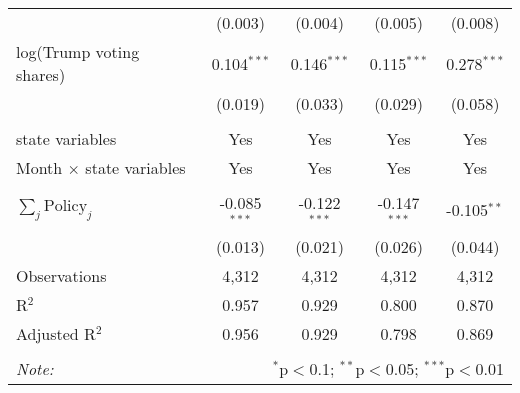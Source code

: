 \begin{tabular}{@{\extracolsep{1pt}}lcccc}
  & (0.003) & (0.004) & (0.005) & (0.008) \\ 
  log(Trump voting shares) & 0.104$^{***}$ & 0.146$^{***}$ & 0.115$^{***}$ & 0.278$^{***}$ \\ 
  & (0.019) & (0.033) & (0.029) & (0.058) \\ 
 \hline \\[-1.8ex] 
state variables & Yes & Yes & Yes & Yes \\ 
Month $\times$ state variables & Yes & Yes & Yes & Yes \\ 
\hline \\[-1.8ex] 
$\sum_j \mathrm{Policy}_j$ & -0.085$^{***}$ & -0.122$^{***}$ & -0.147$^{***}$ & -0.105$^{**}$ \\ 
 & (0.013) & (0.021) & (0.026) & (0.044) \\ 
Observations & 4,312 & 4,312 & 4,312 & 4,312 \\ 
R$^{2}$ & 0.957 & 0.929 & 0.800 & 0.870 \\ 
Adjusted R$^{2}$ & 0.956 & 0.929 & 0.798 & 0.869 \\ 
\hline 
\hline \\[-1.8ex] 
\textit{Note:}  & \multicolumn{4}{r}{$^{*}$p$<$0.1; $^{**}$p$<$0.05; $^{***}$p$<$0.01} \\ 
\end{tabular} 